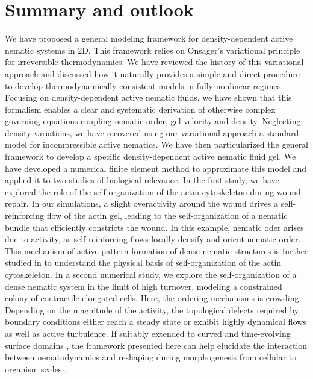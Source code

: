 \documentclass[12pt]{iopart}
\begin{document}
	\section{Summary and outlook} \label{summary}
	
	We have proposed a general modeling framework for density-dependent active nematic systems in 2D. This framework relies on Onsager's variational principle for irreversible thermodynamics. We have reviewed the history of this variational approach and discussed how it naturally provides a simple and direct  procedure to develop thermodynamically consistent models in fully nonlinear regimes. Focusing on density-dependent active nematic fluids, we have shown that this formalism enables a clear and systematic derivation of otherwise complex governing equations coupling nematic order, gel velocity and density. Neglecting density variations, we have recovered using our variational approach a standard model for incompressible active nematics. We have then particularized the general framework to develop a specific density-dependent active nematic fluid gel. We have developed a numerical finite element method to approximate this model and applied it to two studies of biological relevance. In the first study, we have explored the role of the self-organization of the actin cytoskeleton during wound repair. In our simulations, a slight overactivity around the wound drives a self-reinforcing flow of the actin gel, leading to the self-organization of a nematic bundle that efficiently constricts the wound. In this example, nematic oder arises due to activity, as self-reinforcing flows locally densify and orient nematic order. This mechanism of active pattern formation of dense nematic structures is further studied in \cite{mirza2022} to understand the physical basis of self-organization of the actin cytoskeleton. In a second numerical study, we explore the self-organization of a dense nematic system in the limit of high turnover, modeling a constrained colony of contractile elongated cells. Here, the ordering mechanisms is crowding. Depending on the magnitude of the activity, the topological defects required by boundary conditions either reach a steady state or exhibit highly dynamical flows as well as active turbulence. If suitably extended to curved and time-evolving surface domains \cite{mirza2023}, the framework presented here can help elucidate the interaction between nematodynamics and reshaping during morphogenesis from cellular to organism scales \cite{mayer2010,maroudas2021}.
	
\end{document}
